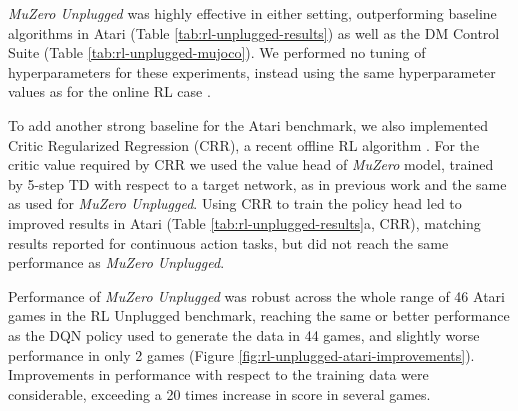 \documentclass{article}
\newcommand{\muzero}{\emph{MuZero}}
\newcommand{\mzunplugged}{\emph{MuZero Unplugged}}
\begin{document}
\mzunplugged{} was highly effective in either setting, outperforming baseline algorithms in Atari (Table \ref{tab:rl-unplugged-results}) as well as the DM Control Suite (Table \ref{tab:rl-unplugged-mujoco}). We performed no tuning of hyperparameters for these experiments, instead using the same hyperparameter values as for the online RL case \cite{muzero, muzero_sampled}.

To add another strong baseline for the Atari benchmark, we also implemented Critic Regularized Regression (CRR), a recent offline RL algorithm \cite{wang2020critic}. For the critic value required by CRR we used the value head of \muzero{} model, trained by 5-step TD with respect to a target network, as in previous work \cite{muzero} and the same as used for \mzunplugged{}. Using CRR to train the policy head led to improved results in Atari (Table \ref{tab:rl-unplugged-results}a, CRR), matching results reported for continuous action tasks, but did not reach the same performance as \mzunplugged{}.

Performance of \mzunplugged{} was robust across the whole range of 46 Atari games in the RL Unplugged benchmark, reaching the same or better performance as the DQN policy used to generate the data in 44 games, and slightly worse performance in only 2 games (Figure \ref{fig:rl-unplugged-atari-improvements}). Improvements in performance with respect to the training data were considerable, exceeding a 20 times increase in score in several games.
\end{document}
